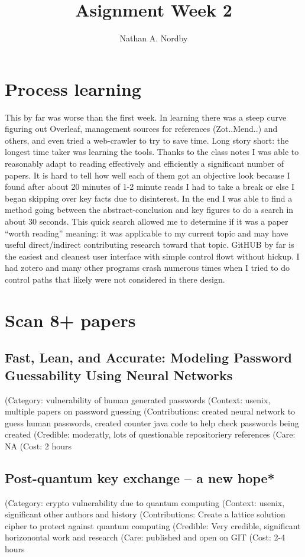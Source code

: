 \documentclass[conference]{journal}
\title{Asignment Week 2}
\author{Nathan A. Nordby}
\begin{document}
\maketitle





\section{Process learning}

This by far was worse than the first week. In learning there was a steep curve figuring out Overleaf, management sources for references (Zot..Mend..) and others, and even tried a web-crawler to try to save time. Long story short: the longest time taker was learning the tools. Thanks to the class notes I was able to reasonably adapt to reading effectively and efficiently a significant number of papers. It is hard to tell how well each of them got an objective look because I found after about 20 minutes of 1-2 minute reads I had to take a break or else I began skipping over key facts due to disinterest. In the end I was able to find a method going between the abstract-conclusion and key figures to do a search in about 30 seconds. This quick search allowed me to determine if it was a paper “worth reading” meaning: it was applicable to my current topic and may have useful direct/indirect contributing research toward that topic. GitHUB by far is the easiest and cleanest user interface with simple control flowt without hickup. I had zotero and many other programs crash numerous times when I tried to do control paths that likely were not considered in there design.

\section{Scan 8+ papers}
\subsection{Fast, Lean, and Accurate: Modeling Password Guessability Using Neural Networks \cite{melicher_fast_2016}}
(Category:	vulnerability of human generated passwords
(Context:	usenix, multiple papers on password guessing
(Contributions:	created neural network to guess human passwords, created counter java code to help check passwords being created
(Credible:	moderatly, lots of questionable repositoriery references
(Care:	NA
(Cost:	2 hours

\subsection{Post-quantum key exchange – a new hope* \cite{alkim_post-quantum_2016}}
(Category:	crypto vulnerability due to quantum computing
(Context:	usenix, significant other authors and history
(Contributions:	Create a lattice solution cipher to protect against quantum computing
(Credible:	Very credible, significant horizonontal work and research
(Care:	published and open on GIT
(Cost:	2-4 hours
\end{document}

